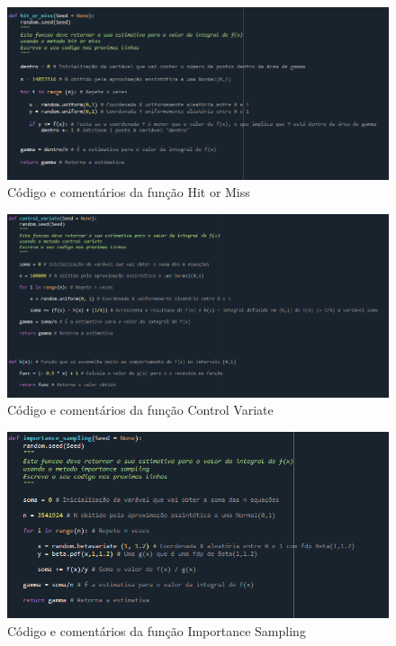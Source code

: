 \documentclass{article}
\begin{document}
    \begin{figure}[H]
        \centering
        \includegraphics[width= 1 \textwidth]{Código hit or miss.png}
        \caption{Código e comentários da função Hit or Miss}
        \label{fig:grafico}
    \end{figure}

    \begin{figure}[H]
        \centering
        \includegraphics[width= 1 \textwidth]{Código control variate.png}
        \caption{Código e comentários da função Control Variate}
        \label{fig:grafico}
    \end{figure}
    
    \begin{figure}[H]
        \centering
        \includegraphics[width= 1 \textwidth]{Código importance sampling.png}
        \caption{Código e comentários da função Importance Sampling}
        \label{fig:grafico}
    \end{figure}
\end{document}
